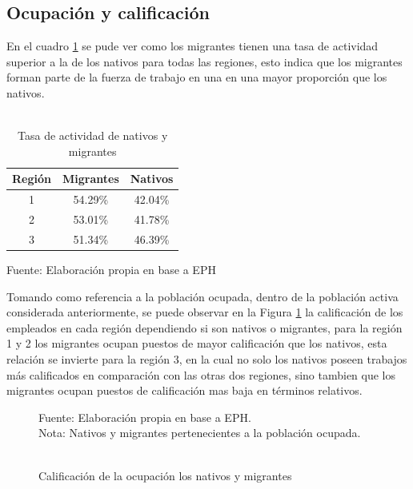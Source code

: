 \documentclass[12pt,a4paper]{article}
\begin{document}
\subsection{Ocupación y calificación}
En el cuadro \ref{cuadro:tasaactiv_mig} se pude ver como los migrantes tienen una tasa de actividad superior a la de los nativos para todas las regiones, esto indica que los migrantes forman parte de la fuerza de trabajo en una en una mayor proporción que los nativos.
\begin{table}[ht]
\centering
\caption{\\Tasa de actividad de nativos y migrantes} 
\begin{tabular}{ccc}
  \hline
 Región & Migrantes & Nativos \\ 
  \hline
   1 & 54.29\% & 42.04\% \\ 
   2 & 53.01\% & 41.78\% \\ 
   3 & 51.34\% & 46.39\% \\ 
   \hline
\end{tabular}
\label{cuadro:tasaactiv_mig}
\begin{flushleft}
\begin{scriptsize}
Fuente: Elaboración propia en base a EPH
\end{scriptsize}
\end{flushleft}
\end{table}
\newpage
Tomando como referencia a la población ocupada, dentro de la población activa considerada anteriormente, se puede observar en la Figura \ref{figure:calif_mig} la calificación de los empleados en cada región dependiendo si son nativos o migrantes, para la región 1 y 2 los migrantes ocupan puestos de mayor calificación que los nativos, esta relación se invierte para la región 3, en la cual no solo los nativos poseen trabajos más calificados en comparación con las otras dos regiones, sino tambien que los migrantes ocupan puestos de calificación mas baja en términos relativos.

\begin{figure}[ht!]
\begin{center}
\caption{\\Calificación de la ocupación los nativos y migrantes}
\label{figure:calif_mig}
 
\end{center}
\begin{flushleft}
\begin{scriptsize}
Fuente: Elaboración propia en base a EPH.
\\Nota: Nativos y migrantes pertenecientes a la población ocupada.
\end{scriptsize}
\end{flushleft}
\end{figure}
\end{document}
